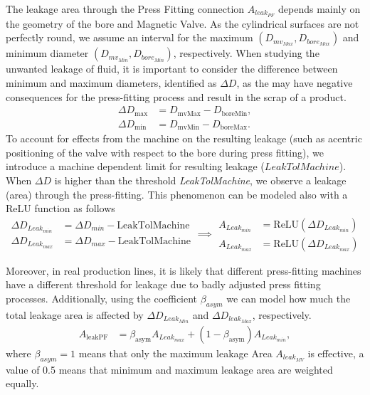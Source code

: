 The leakage area through the Press Fitting connection $A_{leak_{PF}}$ depends mainly on the geometry of the bore and Magnetic Valve. As the cylindrical surfaces are not perfectly round, we assume an interval for the maximum $(D_{mv_{Max}}, D_{bore_{Max}})$ and minimum diameter $(D_{mv_{Min}}, D_{bore_{Min}})$, respectively.
When studying the unwanted leakage of fluid, it is important to consider the difference between minimum and maximum diameters, identified as $\Delta D$, as the may have negative consequences for the press-fitting process and result in the scrap of a product. 
\begin{equation}
\begin{split}
    \Delta D_{\text{max}} &= D_{\text{mvMax}} - D_{\text{boreMin}}, \\
    \Delta D_{\text{min}} &= D_{\text{mvMin}} - D_{\text{boreMax}}.
\end{split}
\end{equation}
To account for effects from the machine on the resulting leakage (such as acentric positioning of the valve with respect to the bore during press fitting), we introduce a machine dependent limit for resulting leakage ($LeakTolMachine$). When $\Delta D$ is higher than the threshold \textit{LeakTolMachine}, we observe a leakage (area) through the press-fitting. This phenomenon can be modeled also with a ReLU function as follows 
\begin{equation}
\begin{split}
    \Delta D_{Leak_{min}} &= \Delta D_{min} - \text{LeakTolMachine} \\
    \Delta D_{Leak_{max}} &= \Delta D_{max} - \text{LeakTolMachine}
\end{split}
\implies 
\begin{split}
    A_{Leak_{min}} &= \text{ReLU}(\Delta D_{Leak_{min}}) \\
    A_{Leak_{max}} &= \text{ReLU}(\Delta D_{Leak_{max}})
\end{split}
\end{equation}

Moreover, in real production lines, it is likely that different press-fitting machines have a different threshold for leakage due to badly adjusted press fitting processes. 
Additionally, using the coefficient $\beta_{asym}$ we can model how much the total leakage area is affected by $\Delta D_{Leak_{Min}}$ and $\Delta D_{leak_{Max}}$, respectively. 
\begin{equation} \label{eq:total_leakage_asym}
\begin{split}
    A_{\text{leakPF}} &= \beta_{\text{asym}} A_{Leak_{max}} + (1 - \beta_{\text{asym}}) A_{Leak_{min}},
\end{split}
\end{equation}
where $\beta_{asym} = 1$ means that only the maximum leakage Area $A_{leak_{MV}}$ is effective, a value of 0.5 means that minimum and maximum leakage area are weighted equally. 
